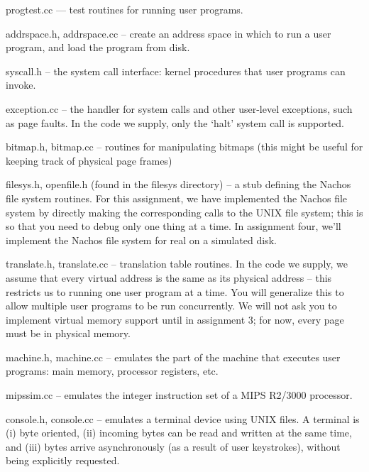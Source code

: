 \begin{description}

\item progtest.cc --- test routines for running user programs.

\item addrspace.h, addrspace.cc -- create an address space in which
to run a user program, and load the program from disk.

\item syscall.h -- the system call interface: kernel procedures that
user programs can invoke.

\item exception.cc -- the handler for system calls and other user-level
exceptions, such as page faults.  In the code we supply, only the
`halt' system call is supported.

\item bitmap.h, bitmap.cc -- routines for manipulating bitmaps
(this might be useful for keeping track of physical page frames)

\item filesys.h, openfile.h (found in the filesys directory) -- a stub
defining the Nachos file system routines.
For this assignment, we have implemented the Nachos file system
by directly making the corresponding calls to the UNIX file system;
this is so that you need to debug only one thing at a time.
In assignment four, we'll implement the Nachos file system for real
on a simulated disk.

\item translate.h, translate.cc -- translation table routines.  In the code
we supply, we assume that every virtual address is the same as its
physical address -- this restricts us to running one user program at
a time.  You will generalize this to allow multiple user programs to
be run concurrently.  We will not ask you to implement virtual
memory support until in assignment 3; for now, every page must
be in physical memory.

\item machine.h, machine.cc -- emulates the part of the machine that
executes user programs: main memory, processor registers, etc.

\item mipssim.cc -- emulates the integer instruction set of a
MIPS R2/3000 processor.

\item console.h, console.cc -- emulates a terminal device using UNIX files.
A terminal is (i) byte oriented, (ii) incoming bytes can be read and
written at the same time, and (iii) bytes arrive asynchronously (as a
result of user keystrokes), without being explicitly requested.

\end{description}

